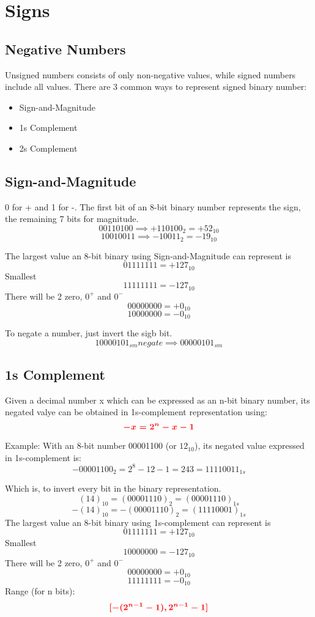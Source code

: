 \documentclass[12pt]{article} %
\begin{document}
\section{Signs} 
\subsection*{Negative Numbers}
Unsigned numbers consists of only non-negative values, while signed numbers include all values.
There are 3 common ways to represent signed binary number: 
\begin{itemize}
    \item Sign-and-Magnitude
    \item 1s Complement
    \item 2s Complement
\end{itemize}
\subsection{Sign-and-Magnitude}
0 for + and 
1 for -.
The first bit of an 8-bit binary number represents the sign, the remaining 7 bits for magnitude.
\[00110100 \implies +110100_2 = +52_{10}\]
\[10010011 \implies -10011_2 = -19_{10}\]

The largest value an 8-bit binary using Sign-and-Magnitude can represent is 
\[01111111 = +127_{10}\]
Smallest
\[11111111 = -127_{10}\]
There will be 2 zero, \(0^+\) and \(0^-\)
\[00000000 = +0_{10}\]
\[10000000 = -0_{10}\]

To negate a number, just invert the sigb bit.
\[10000101_{sm} negate \implies 00000101_{sm}\]

\subsection{1s Complement}
Given a decimal number x which can be expressed as an n-bit binary number, its negated valye can be obtained in 1s-complement representation using:
\[
\textcolor{red}{\boldsymbol{-x = 2^n - x - 1}}
\]

Example: With an 8-bit number 00001100 (or \(12_{10}\)), its negated value expressed in 1s-complement is:
\[-00001100_2 = 2^8 - 12 - 1 = 243 = 11110011_{1s}\]

Which is, to invert every bit in the binary representation.
\[(14)_{10} = (00001110)_2 = (00001110)_{1s}\]
\[-(14)_{10} = -(00001110)_2 = (11110001)_{1s}\]
The largest value an 8-bit binary using 1s-complement can represent is 
\[01111111 = +127_{10}\]
Smallest
\[10000000 = -127_{10}\]
There will be 2 zero, \(0^+\) and \(0^-\)
\[00000000 = +0_{10}\]
\[11111111 = -0_{10}\]
Range (for n bits): 
\[
\textcolor{red}{\boldsymbol{[-(2^{n - 1} - 1), 2^{n - 1} - 1]}}
\]
\end{document}
